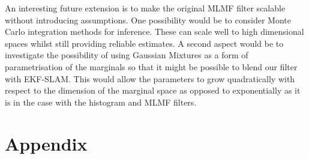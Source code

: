 An interesting future extension is to make the original MLMF filter scalable without introducing assumptions.
One possibility would be to consider Monte Carlo integration methods for inference. These can scale well to high dimensional 
spaces whilst still providing reliable estimates. A second aspect would be to investigate the possibility
of using Gaussian Mixtures as a form of parametrisation of the marginals so that it might be possible to blend our filter with  
EKF-SLAM. This would allow the parameters to grow quadratically with respect to the dimension of the marginal space as opposed to
exponentially as it is in the case with the histogram and MLMF filters.



\section{Appendix}\label{ch5:appendix}


